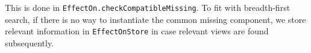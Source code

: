 

\begin{impNote}
This is done in \texttt{EffectOn.\linebreak[1]check\-Compatible\-Missing}.  To
fit with breadth-first search, if there is no way to instantiate the common
missing component, we store relevant information in \texttt{EffectOnStore} in
case relevant views are found subsequently.
\end{impNote}
